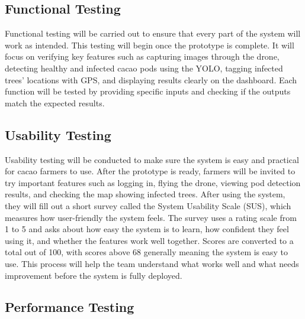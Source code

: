 \subsection{Functional Testing}

Functional testing will be carried out to ensure that every part of the system will work as intended. This testing will begin once the prototype is complete. It will focus on verifying key features such as capturing images through the drone, detecting healthy and infected cacao pods using the YOLO, tagging infected trees’ locations with GPS, and displaying results clearly on the dashboard. Each function will be tested by providing specific inputs and checking if the outputs match the expected results.

\subsection{Usability Testing}

Usability testing will be conducted to make sure the system is easy and practical for cacao farmers to use. After the prototype is ready, farmers will be invited to try important features such as logging in, flying the drone, viewing pod detection results, and checking the map showing infected trees. After using the system, they will fill out a short survey called the System Usability Scale (SUS), which measures how user-friendly the system feels. The survey uses a rating scale from 1 to 5 and asks about how easy the system is to learn, how confident they feel using it, and whether the features work well together. Scores are converted to a total out of 100, with scores above 68 generally meaning the system is easy to use. This process will help the team understand what works well and what needs improvement before the system is fully deployed.
\pagebreak

\subsection*{Performance Testing}

